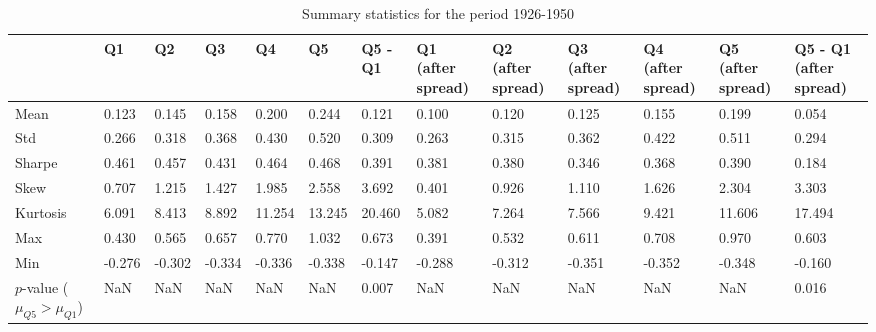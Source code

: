 \begin{table}
\caption{Summary statistics for the period 1926-1950}
\label{tab:summary_1926_1950}
\begin{tabular}{lllllllllllll}
\toprule
 & Q1 & Q2 & Q3 & Q4 & Q5 & Q5 - Q1 & Q1 (after spread) & Q2 (after spread) & Q3 (after spread) & Q4 (after spread) & Q5 (after spread) & Q5 - Q1 (after spread) \\
\midrule
Mean & 0.123 & 0.145 & 0.158 & 0.200 & 0.244 & 0.121 & 0.100 & 0.120 & 0.125 & 0.155 & 0.199 & 0.054 \\
Std & 0.266 & 0.318 & 0.368 & 0.430 & 0.520 & 0.309 & 0.263 & 0.315 & 0.362 & 0.422 & 0.511 & 0.294 \\
Sharpe & 0.461 & 0.457 & 0.431 & 0.464 & 0.468 & 0.391 & 0.381 & 0.380 & 0.346 & 0.368 & 0.390 & 0.184 \\
Skew & 0.707 & 1.215 & 1.427 & 1.985 & 2.558 & 3.692 & 0.401 & 0.926 & 1.110 & 1.626 & 2.304 & 3.303 \\
Kurtosis & 6.091 & 8.413 & 8.892 & 11.254 & 13.245 & 20.460 & 5.082 & 7.264 & 7.566 & 9.421 & 11.606 & 17.494 \\
Max & 0.430 & 0.565 & 0.657 & 0.770 & 1.032 & 0.673 & 0.391 & 0.532 & 0.611 & 0.708 & 0.970 & 0.603 \\
Min & -0.276 & -0.302 & -0.334 & -0.336 & -0.338 & -0.147 & -0.288 & -0.312 & -0.351 & -0.352 & -0.348 & -0.160 \\
$p$-value ($\mu_{Q5} > \mu_{Q1}$) & NaN & NaN & NaN & NaN & NaN & 0.007 & NaN & NaN & NaN & NaN & NaN & 0.016 \\
\bottomrule
\end{tabular}
\end{table}
